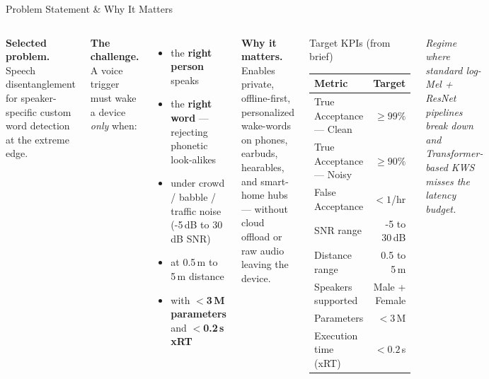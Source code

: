 \documentclass[aspectratio=169,10pt]{beamer}
\newcommand{\highlight}[1]{\textcolor{srired}{\textbf{#1}}}
\begin{document}
\begin{frame}{Problem Statement \& Why It Matters}
  \begin{columns}[T, onlytextwidth]
      \textbf{\color{sriblue}Selected problem.} Speech disentanglement for speaker-specific custom word detection at the extreme edge.
      \vspace{0.6em}

      \textbf{\color{sriblue}The challenge.}
      A voice trigger must wake a device \emph{only} when:
      \begin{itemize}\setlength\itemsep{2pt}
        \item the \highlight{right person} speaks
        \item the \highlight{right word} — rejecting phonetic look-alikes
        \item under crowd / babble / traffic noise (-5\,dB to 30\,dB SNR)
        \item at 0.5\,m to 5\,m distance
        \item with \highlight{$<$3\,M parameters} and \highlight{$<$0.2\,s xRT}
      \end{itemize}
      \vspace{0.4em}

      \textbf{\color{sriblue}Why it matters.} Enables private, offline-first, personalized wake-words on phones, earbuds, hearables, and smart-home hubs — without cloud offload or raw audio leaving the device.
      \begin{block}{Target KPIs (from brief)}
        \centering\small
        \begin{tabular}{@{}lr@{}}
          \toprule
          Metric & Target \\
          \midrule
          True Acceptance — Clean & $\geq 99\%$ \\
          True Acceptance — Noisy & $\geq 90\%$ \\
          False Acceptance        & $< 1$/hr \\
          SNR range               & -5 to 30\,dB \\
          Distance range          & 0.5 to 5\,m \\
          Speakers supported      & Male + Female \\
          Parameters              & $< 3$\,M \\
          Execution time (xRT)    & $< 0.2$\,s \\
          \bottomrule
        \end{tabular}
      \end{block}
      \vspace{0.3em}
      \small\color{srigray}
      \textit{Regime where standard log-Mel + ResNet pipelines break down and Transformer-based KWS misses the latency budget.}
  \end{columns}
\end{frame}
\end{document}
